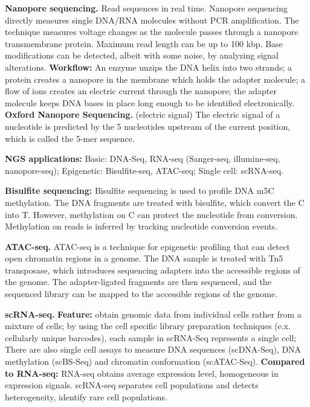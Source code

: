 \vspace{0.1em}\noindent
\textbf{Nanopore sequencing.} Read sequences in real time. Nanopore sequencing directly measures single DNA/RNA molecules without PCR amplification. The technique measures voltage changes as the molecule passes through a nanopore transmembrane protein. Maximum read length can be up to 100 kbp. Base modifications can be detected, albeit with some noise, by analyzing signal alterations. \textbf{Workflow:} An enzyme unzips the DNA helix into two strands; a protein creates a nanopore in the membrane which holds the adapter molecule; a flow of ions creates an electric current through the nanopore; the adapter molecule keeps DNA bases in place long enough to be identified electronically. \textbf{Oxford Nanopore Sequencing.} (electric signal) The electric signal of a nucleotide is predicted by the 5 nucleotides upstream of the current position, which is called the 5-mer sequence.

\vspace{0.1em}\noindent
\textbf{NGS applications:} Basic: DNA-Seq, RNA-seq (Sanger-seq, illumine-seq, nanopore-seq); Epigenetic: Bisulfite-seq, ATAC-seq; Single cell: scRNA-seq. 

\vspace{0.1em}\noindent
\textbf{Bisulfite sequencing:} Bisulfite sequencing is used to profile DNA m5C methylation. The DNA fragments are treated with bisulfite, which convert the C into T. However, methylation on C can protect the nucleotide from conversion. Methylation on reads is inferred by tracking nucleotide conversion events. 

\vspace{0.1em}\noindent
\textbf{ATAC-seq.} ATAC-seq is a technique for epigenetic profiling that can detect open chromatin regions in a genome. The DNA sample is treated with Tn5 transposase, which introduces sequencing adapters into the accessible regions of the genome. The adapter-ligated fragments are then sequenced, and the sequenced library can be mapped to the accessible regions of the genome. 

\vspace{0.1em}\noindent
\textbf{scRNA-seq.} \textbf{Feature:} obtain genomic data from individual cells rather from a mixture of cells; by using the cell specific library preparation techniques (e.x. cellularly unique barcodes), each sample in scRNA-Seq represents a single cell; There are also single cell assays to measure DNA sequences (scDNA-Seq), DNA methylation (scBS-Seq) and chromatin conformation (scATAC-Seq). \textbf{Compared to RNA-seq:} RNA-seq obtains average expression level, homogeneous in expression signals. scRNA-seq separates cell populations and detects heterogeneity, identify rare cell populations.

